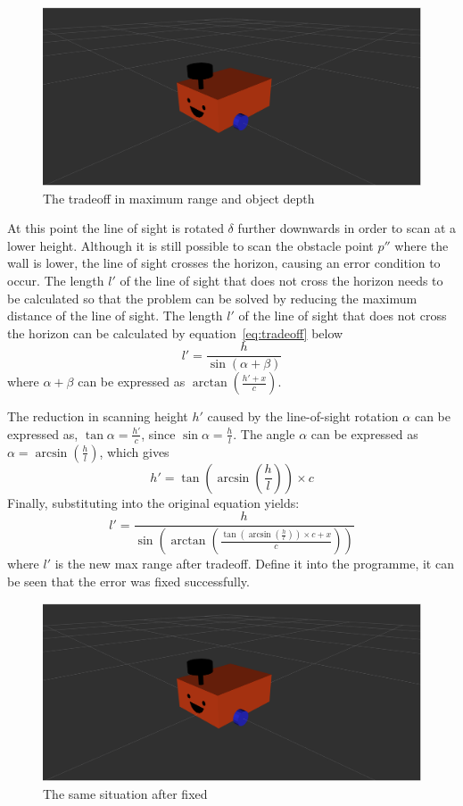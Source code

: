 \begin{figure}[H]
    \centering
    \includegraphics[width=0.8\linewidth]{figs/robot.png}
    \caption{The tradeoff in maximum range and object depth}
    \label{fig:tradeoff2}
\end{figure}

At this point the line of sight is rotated $\delta$ further downwards in order to scan at a lower height. Although it is still possible to scan the obstacle point $p''$ where the wall is lower, the line of sight crosses the horizon, causing an error condition to occur. The length $l'$ of the line of sight that does not cross the horizon needs to be calculated so that the problem can be solved by reducing the maximum distance of the line of sight. 
The length $l'$ of the line of sight that does not cross the horizon can be calculated by equation~\ref{eq:tradeoff} below 
\begin{equation}
    l'=\frac{h}{\sin{(\alpha+\beta)}}
    \label{eq:tradeoff}
\end{equation}
where $\alpha+\beta$ can be expressed as $\arctan(\frac{h'+x}{c})$. 

The reduction in scanning height $h'$ caused by the line-of-sight rotation $\alpha$ can be expressed as, $\tan\alpha=\frac{h'}{c}
$, since $\sin\alpha=\frac{h}{l}$. The angle $\alpha$ can be expressed as $\alpha=\arcsin(\frac{h}{l})$, which gives
\begin{equation}
    h'=\tan(\arcsin(\frac{h}{l}))\times c
\end{equation}
Finally, substituting into the original equation yields: 
\begin{equation}
    l'=\frac{h}{\sin{(\arctan(\frac{\tan(\arcsin(\frac{h}{l}))\times c+x}{c}))}}
\end{equation}
where $l'$ is the new max range after tradeoff. Define it into the programme, it can be seen that the error was fixed successfully.

\begin{figure}[H]
    \centering
    \includegraphics[width=0.8\linewidth]{figs/robot.png}
    \caption{The same situation after fixed}
    \label{fig:fixed}
\end{figure}

